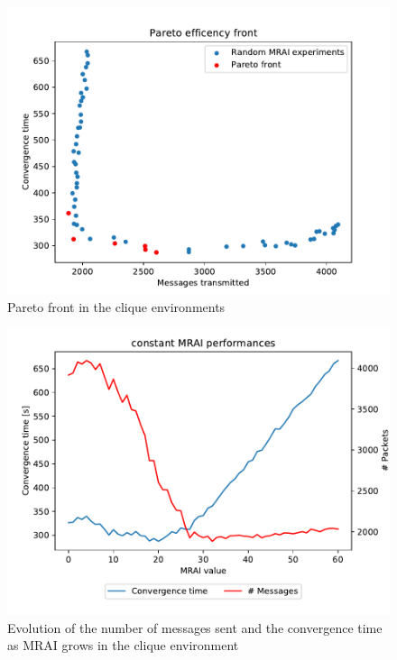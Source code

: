 \documentclass[10pt,conference,letterpaper]{IEEEtran}
\newcommand{\figwidth}{0.78}
\newcommand{\figvspace}{-1.5em}
\begin{document}
\begin{figure}[tb]
	\centering
	\includegraphics[width=\figwidth\columnwidth]{images/clique/pareto-clique-constant}
	\caption{Pareto front in the clique environments}
	\label{fig:clique_pareto_freq}
	\vspace{\figvspace}
\end{figure}

\begin{figure}[tb]
	\centering
	\includegraphics[width=\figwidth\columnwidth]{images/clique/mrai_evolution}
	\caption{Evolution of the number of messages sent and the convergence time as \ac{MRAI} grows
		in the clique environment}
	\label{fig:clique_mrai_evolution}
	\vspace{\figvspace}
\end{figure}
\end{document}
